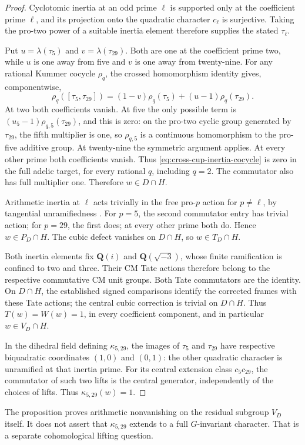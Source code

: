 \begin{proof}
Cyclotomic inertia at an odd prime \(\ell\) is supported
only at the coefficient prime \(\ell\), and its projection
onto the quadratic character \(c_\ell\) is surjective.
Taking the pro-two power of a suitable inertia element
therefore supplies the stated \(\tau_\ell\).

Put \(u=\lambda(\tau_5)\) and \(v=\lambda(\tau_{29})\).
Both are one at the coefficient prime two, while \(u\)
is one away from five and \(v\) is one away from twenty-nine.
For any rational Kummer cocycle \(\rho_q\), the crossed
homomorphism identity gives, componentwise,
\begin{equation}
 \rho_q([\tau_5,\tau_{29}])
       =(1-v)\rho_q(\tau_5)+(u-1)\rho_q(\tau_{29}).        \label{eq:cross-cup-inertia-cocycle}
\end{equation}
At two both coefficients vanish.
At five the only possible term is
\((u_5-1)\rho_{q,5}(\tau_{29})\), and this is zero:
on the pro-two cyclic group generated by \(\tau_{29}\),
the fifth multiplier is one, so \(\rho_{q,5}\) is a
continuous homomorphism to the pro-five additive group.
At twenty-nine the symmetric argument applies.
At every other prime both coefficients vanish.
Thus \eqref{eq:cross-cup-inertia-cocycle} is zero in the full adelic target, for every
rational \(q\), including \(q=2\). The commutator also
has full multiplier one. Therefore \(w\in D\cap H\).

Arithmetic inertia at \(\ell\) acts trivially in the
free pro-\(p\) action for \(p\ne\ell\), by
tangential unramifiedness
\cite[\S8.5, p.~151]{HainMatsumoto2003}.
For \(p=5\), the second commutator entry has trivial
action; for \(p=29\), the first does; at every other
prime both do. Hence \(w\in P_D\cap H\).
The cubic defect vanishes on \(D\cap H\), so
\(w\in T_D\cap H\).

Both inertia elements fix \(\mathbf Q(i)\) and
\(\mathbf Q(\sqrt{-3})\), whose finite ramification is
confined to two and three.
Their CM Tate actions therefore belong to the
respective commutative CM unit groups.
Both Tate commutators are the identity.
On \(D\cap H\), the established signed comparisons
identify the corrected frames with these Tate actions;
the central cubic correction is trivial on \(D\cap H\).
Thus \(T(w)=W(w)=1\), in every coefficient component,
and in particular \(w\in V_D\cap H\).

In the dihedral field defining \(\kappa_{5,29}\),
the images of \(\tau_5\) and \(\tau_{29}\) have respective
biquadratic coordinates \((1,0)\) and \((0,1)\):
the other quadratic character is unramified at that
inertia prime.
For its central extension class \(c_5c_{29}\), the
commutator of such two lifts is the central generator,
independently of the choices of lifts.
Thus \(\kappa_{5,29}(w)=1\).
\end{proof}

The proposition proves arithmetic nonvanishing on the
residual subgroup $V_D$ itself. It does not assert
that \(\kappa_{5,29}\) extends to a full \(G\)-invariant
character. That is a separate cohomological lifting
question.
